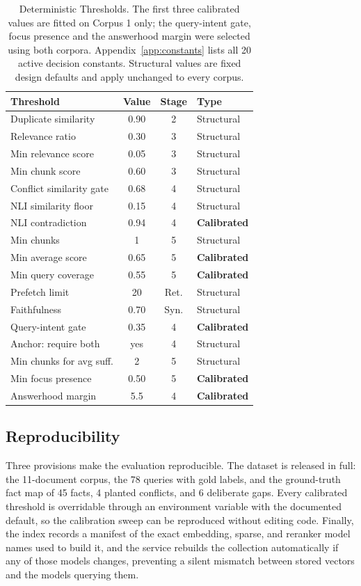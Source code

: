 \documentclass[conference]{IEEEtran}
\begin{document}
\begin{table}[htbp]
\caption{Deterministic Thresholds. The first three calibrated values are
fitted on Corpus 1 only; the query-intent gate, focus presence and the
answerhood margin were selected using both corpora. Appendix~\ref{app:constants}
lists all 20 active decision constants. Structural values are
fixed design defaults and apply unchanged to every corpus.}
\label{tab:thresholds}
\centering
\small
\begin{tabularx}{\columnwidth}{@{}X c c l@{}}
\toprule
Threshold & Value & Stage & Type \\
\midrule
Duplicate similarity     & 0.90 & 2 & Structural \\
Relevance ratio          & 0.30 & 3 & Structural \\
Min relevance score      & 0.05 & 3 & Structural \\
Min chunk score          & 0.60 & 3 & Structural \\
Conflict similarity gate & 0.68 & 4 & Structural \\
NLI similarity floor     & 0.15 & 4 & Structural \\
NLI contradiction        & 0.94 & 4 & \textbf{Calibrated} \\
Min chunks               & 1    & 5 & Structural \\
Min average score        & 0.65 & 5 & \textbf{Calibrated} \\
Min query coverage       & 0.55 & 5 & \textbf{Calibrated} \\
Prefetch limit           & 20   & Ret. & Structural \\
Faithfulness             & 0.70 & Syn. & Structural \\
Query-intent gate        & 0.35 & 4 & \textbf{Calibrated} \\
Anchor: require both     & yes  & 4 & Structural \\
Min chunks for avg suff. & 2    & 5 & Structural \\
Min focus presence       & 0.50 & 5 & \textbf{Calibrated} \\
Answerhood margin        & 5.5  & 4 & \textbf{Calibrated} \\

\bottomrule
\end{tabularx}
\end{table}

\subsection{Reproducibility}
Three provisions make the evaluation reproducible. The dataset is released
in full: the 11-document corpus, the 78 queries with gold labels, and the
ground-truth fact map of 45 facts, 4 planted conflicts, and 6 deliberate
gaps. Every calibrated threshold is overridable through an environment
variable with the documented default, so the calibration sweep can be
reproduced without editing code. Finally, the index records a manifest of
the exact embedding, sparse, and reranker model names used to build it, and
the service rebuilds the collection automatically if any of those models
changes, preventing a silent mismatch between stored vectors and the models
querying them.
\end{document}
